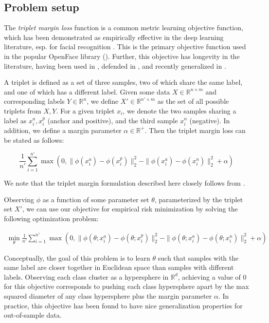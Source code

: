 \documentclass[11pt]{article}
\begin{document}
\subsection{Problem setup}

The \textit{triplet margin loss} function is a common metric learning objective function, which has been demonstrated as empirically effective in the deep learning literature, esp. for facial recognition \cite{schroff_facenet_2015}. This is the primary objective function used in the popular OpenFace library (\cite{amos_openface_2016}). Further, this objective has longevity in the literature, having been used in \cite{araujo_large_2009}, defended in \cite{hermans_defense_2017}, and recently generalized in \cite{qian_softtriple_2019}.

A triplet is defined as a set of three samples, two of which share the same label, and one of which has a different label. Given some data $X \in \mathbb{R}^{n \times m}$ and corresponding labels $Y \in \mathbb{R}^n$, we define $X' \in \mathbb{R}^{n' \times m}$ as the set of all possible triplets from $X, Y$. For a given triplet $x_i$, we denote the two samples sharing a label as $x_i^a, x_i^p$ (anchor and positive), and the third sample $x_i^n$ (negative). In addition, we define a margin parameter $\alpha \in \mathbb{R}^+$. Then the triplet margin loss can be stated as follows:

\begin{equation}
    \frac{1}{n'} \sum_{i=1}^{n'} \max(0, \| \phi(x_i^a) - \phi(x_i^p)\|_2^2 - \| \phi(x_i^a) - \phi(x_i^n)\|_2^2 + \alpha)
\end{equation}

We note that the triplet margin formulation described here closely follows from \cite{schroff_facenet_2015}.

Observing $\phi$ as a function of some parameter set $\theta$, parameterized by the triplet set $X'$, we can use our objective for empirical risk minimization by solving the following optimization problem:

\begin{equation}
\label{eq:triplet_objective}
\begin{aligned}
    \min_{\theta} \frac{1}{n'} \sum_{i=1}^{n'} \max(0, \| \phi(\theta; x_i^a) - \phi(\theta; x_i^p)\|_2^2 - \| \phi(\theta; x_i^a) - \phi(\theta; x_i^n)\|_2^2 + \alpha)
\end{aligned}
\end{equation}

Conceptually, the goal of this problem is to learn $\theta$ such that samples with the same label are closer together in Euclidean space than samples with different labels. Observing each class cluster as a hypersphere in $\mathbb{R}^d$, achieving a value of $0$ for this objective corresponds to pushing each class hypersphere apart by the max squared diameter of any class hypersphere plus the margin parameter $\alpha$. In practice, this objective has been found to have nice generalization properties for out-of-sample data.
\end{document}

